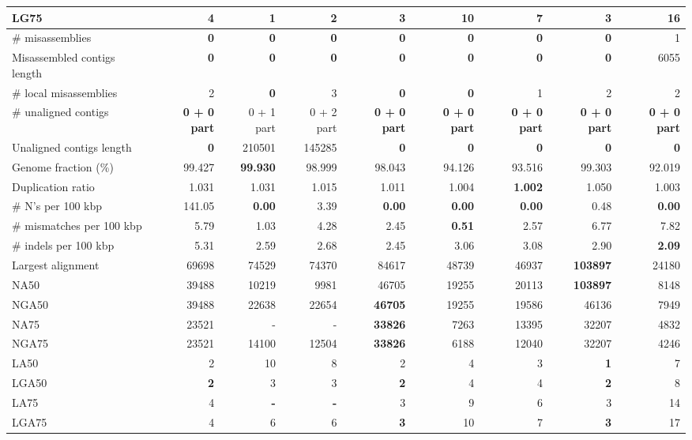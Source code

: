 \documentclass[12pt,a4paper]{article}
\begin{document}
\begin{table}[ht]
\begin{center}
\begin{tabular}{|l*{8}{|r}|}
LG75 & 4 & {\bf 1} & 2 & 3 & 10 & 7 & 3 & 16 \\ \hline
\# misassemblies & {\bf 0} & {\bf 0} & {\bf 0} & {\bf 0} & {\bf 0} & {\bf 0} & {\bf 0} & 1 \\ \hline
Misassembled contigs length & {\bf 0} & {\bf 0} & {\bf 0} & {\bf 0} & {\bf 0} & {\bf 0} & {\bf 0} & 6055 \\ \hline
\# local misassemblies & 2 & {\bf 0} & 3 & {\bf 0} & {\bf 0} & 1 & 2 & 2 \\ \hline
\# unaligned contigs & {\bf 0 + 0 part} & 0 + 1 part & 0 + 2 part & {\bf 0 + 0 part} & {\bf 0 + 0 part} & {\bf 0 + 0 part} & {\bf 0 + 0 part} & {\bf 0 + 0 part} \\ \hline
Unaligned contigs length & {\bf 0} & 210501 & 145285 & {\bf 0} & {\bf 0} & {\bf 0} & {\bf 0} & {\bf 0} \\ \hline
Genome fraction (\%) & 99.427 & {\bf 99.930} & 98.999 & 98.043 & 94.126 & 93.516 & 99.303 & 92.019 \\ \hline
Duplication ratio & 1.031 & 1.031 & 1.015 & 1.011 & 1.004 & {\bf 1.002} & 1.050 & 1.003 \\ \hline
\# N's per 100 kbp & 141.05 & {\bf 0.00} & 3.39 & {\bf 0.00} & {\bf 0.00} & {\bf 0.00} & 0.48 & {\bf 0.00} \\ \hline
\# mismatches per 100 kbp & 5.79 & 1.03 & 4.28 & 2.45 & {\bf 0.51} & 2.57 & 6.77 & 7.82 \\ \hline
\# indels per 100 kbp & 5.31 & 2.59 & 2.68 & 2.45 & 3.06 & 3.08 & 2.90 & {\bf 2.09} \\ \hline
Largest alignment & 69698 & 74529 & 74370 & 84617 & 48739 & 46937 & {\bf 103897} & 24180 \\ \hline
NA50 & 39488 & 10219 & 9981 & 46705 & 19255 & 20113 & {\bf 103897} & 8148 \\ \hline
NGA50 & 39488 & 22638 & 22654 & {\bf 46705} & 19255 & 19586 & 46136 & 7949 \\ \hline
NA75 & 23521 & - & - & {\bf 33826} & 7263 & 13395 & 32207 & 4832 \\ \hline
NGA75 & 23521 & 14100 & 12504 & {\bf 33826} & 6188 & 12040 & 32207 & 4246 \\ \hline
LA50 & 2 & 10 & 8 & 2 & 4 & 3 & {\bf 1} & 7 \\ \hline
LGA50 & {\bf 2} & 3 & 3 & {\bf 2} & 4 & 4 & {\bf 2} & 8 \\ \hline
LA75 & 4 & {\bf -} & {\bf -} & 3 & 9 & 6 & 3 & 14 \\ \hline
LGA75 & 4 & 6 & 6 & {\bf 3} & 10 & 7 & {\bf 3} & 17 \\ \hline
\end{tabular}
\end{center}
\end{table}
\end{document}
